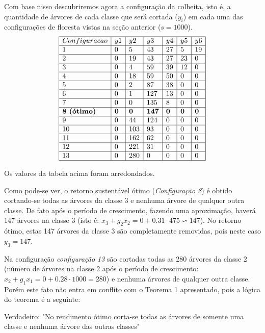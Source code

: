 \documentclass[a4paper, 12pt]{article}
\begin{document}
Com base nisso descubriremos agora a configuração da colheita, isto é, a quantidade de árvores de cada classe que será cortada ($y_i$) em cada uma das configurações de floresta vistas na seção anterior ($s=1000$).
$$
\begin{array}{ | l | l | l | l | l | l | l | }
\hline
	Configuracao & y1 & y2 & y3 & y4 & y5 & y6 \\ \hline
	1 & 0 & 5 & 43 & 27 & 5 & 19 \\ \hline
	2 & 0 & 19 & 43 & 27 & 23 & 0 \\ \hline
	3 & 0 & 4 & 59 & 39 & 12 & 0 \\ \hline
	4 & 0 & 18 & 59 & 50 & 0 & 0 \\ \hline
	5 & 0 & 2 & 87 & 38 & 0 & 0 \\ \hline
	6 & 0 & 1 & 127 & 13 & 0 & 0 \\ \hline
	7 & 0 & 0 & 135 & 8 & 0 & 0 \\ \hline
	\textbf{8 (ótimo)} & \textbf{0} & \textbf{0} & \textbf{147} & \textbf{0} & \textbf{0} & \textbf{0} \\ \hline
	9 & 0 & 44 & 124 & 0 & 0 & 0 \\ \hline
	10 & 0 & 103 & 93 & 0 & 0 & 0 \\ \hline
	11 & 0 & 162 & 62 & 0 & 0 & 0 \\ \hline
	12 & 0 & 221 & 31 & 0 & 0 & 0 \\ \hline
	13 & 0 & 280 & 0 & 0 & 0 & 0 \\ \hline
\end{array}
$$

Os valores da tabela acima foram arredondados.

Como pode-se ver, o retorno sustentável ótimo (\emph{Configuração 8}) é obtido cortando-se todas as árvores da classe 3 e nenhuma árvore de qualquer outra classe. De fato após o período de crescimento, fazendo uma aproximação, haverá 147 árvores na classe 3 (isto é: $x_3+g_2x_2=0+0.31\cdot 475 \backsim 147$). No retorno ótimo, estas 147 árvores da classe 3 são completamente removidas, pois neste caso $y_3=147$.

Na configuração \emph{configuração 13} são cortadas todas as 280 árvores da classe 2 (número de árvores na classe 2 após o período de crescimento: $x_2+g_1x_1=0+0.28\cdot 1000=280$) e nenhuma árvores de qualquer outra classe. Porém este fato não entra em conflito com o Teorema 1 apresentado, pois a lógica do teorema é a seguinte:

Verdadeiro: "No rendimento ótimo corta-se todas as árvores de somente uma classe e nenhuma árvore das outras classes"
\end{document}
